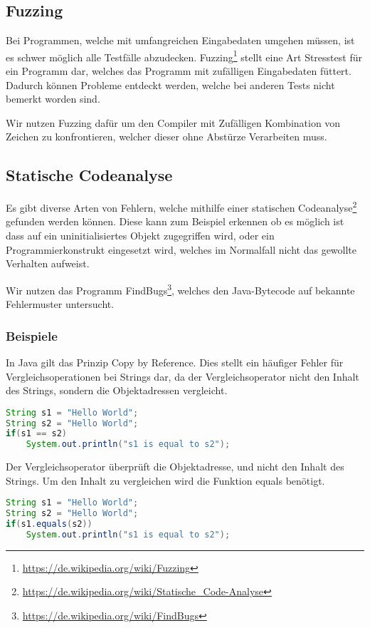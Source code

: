 \subsection{Fuzzing}

Bei Programmen, welche mit umfangreichen Eingabedaten umgehen m\"ussen, ist es schwer m\"oglich alle Testf\"alle abzudecken. Fuzzing\footnote{\url{https://de.wikipedia.org/wiki/Fuzzing}} stellt eine Art Stresstest f\"ur ein Programm dar, welches das Programm mit zuf\"alligen Eingabedaten f\"uttert. Dadurch k\"onnen Probleme entdeckt werden, welche bei anderen Tests nicht bemerkt worden sind.

Wir nutzen Fuzzing daf\"ur um den Compiler mit Zuf\"alligen Kombination von Zeichen zu konfrontieren, welcher dieser ohne Abst\"urze Verarbeiten muss.

\subsection{Statische Codeanalyse}

Es gibt diverse Arten von Fehlern, welche mithilfe einer statischen Codeanalyse\footnote{\url{https://de.wikipedia.org/wiki/Statische_Code-Analyse}} gefunden werden k\"onnen. Diese kann zum Beispiel erkennen ob es m\"oglich ist dass auf ein uninitialisiertes Objekt zugegriffen wird, oder ein Programmierkonstrukt eingesetzt wird, welches im Normalfall nicht das gewollte Verhalten aufweist.

Wir nutzen das Programm FindBugs\footnote{\url{https://de.wikipedia.org/wiki/FindBugs}}, welches den Java-Bytecode auf bekannte Fehlermuster untersucht.

\subsubsection{Beispiele}


In Java gilt das Prinzip \glqq{}Copy by Reference\grqq{}. Dies stellt ein h\"aufiger Fehler f\"ur Vergleichsoperationen bei Strings dar, da der Vergleichsoperator nicht den Inhalt des Strings, sondern die Objektadressen vergleicht.

\begin{lstlisting}[language=Java]
String s1 = "Hello World";
String s2 = "Hello World";
if(s1 == s2)
	System.out.println("s1 is equal to s2");
\end{lstlisting}

Der Vergleichsoperator \"uberpr\"uft die Objektadresse, und nicht den Inhalt des Strings. Um den Inhalt zu vergleichen wird die Funktion equals ben\"otigt.

\begin{lstlisting}[language=Java]
String s1 = "Hello World";
String s2 = "Hello World";
if(s1.equals(s2))
	System.out.println("s1 is equal to s2");
\end{lstlisting}




